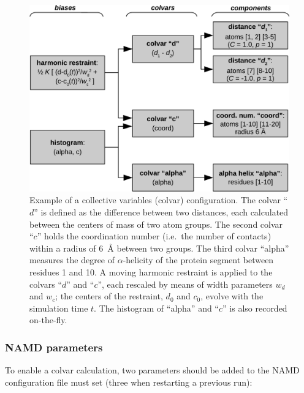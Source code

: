 \begin{figure}[!ht]
  \centering
  \includegraphics[width=12cm]{figures/colvars_diagram}
  \caption{Example of a collective variables (colvar) configuration.
    The colvar ``$d$'' is defined as the difference between two
    distances, each calculated between the centers of mass of two
    atom groups.  The second colvar ``$c$'' holds the coordination
    number (i.e.~the number of contacts) within a radius of 6~\AA{}
    between two groups.  The third colvar ``alpha'' measures the
    degree of $\alpha$-helicity of the protein segment between
    residues 1 and 10. A moving harmonic restraint is applied to the
    colvars ``$d$'' and ``$c$'', each rescaled by means of width
    parameters $w_{d}$ and $w_{c}$; the centers of the restraint,
    $d_0$ and $c_0$, evolve with the simulation time $t$.  The
    histogram of ``alpha'' and ``$c$'' is also recorded on-the-fly.}
  \label{fig:colvars_diagram}
\end{figure}


\subsubsection{NAMD parameters}

To enable a colvar calculation, two parameters should be added to the
NAMD configuration file must set (three when restarting a previous
run):

